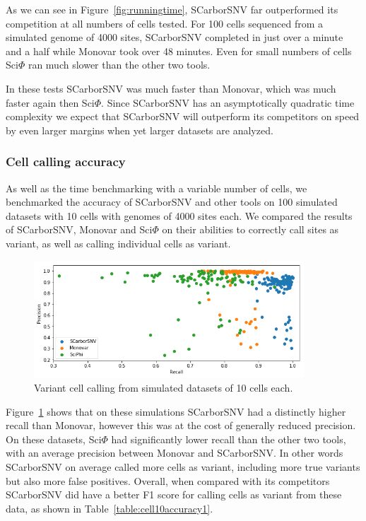 \documentclass[../../main.tex]{subfiles}
\begin{document}
As we can see in Figure~\ref{fig:runningtime}, SCarborSNV far outperformed its competition at all numbers of cells tested.
For 100 cells sequenced from a simulated genome of 4000 sites, SCarborSNV completed in just over a minute and a half while Monovar took over 48 minutes.
Even for small numbers of cells Sci$\Phi$ ran much slower than the other two tools.

In these tests SCarborSNV was much faster than Monovar, which was much faster again then Sci$\Phi$.
Since SCarborSNV has an asymptotically quadratic time complexity we expect that SCarborSNV will outperform its competitors on speed by even larger margins when yet larger datasets are analyzed.

\subsubsection*{Cell calling accuracy}
As well as the time benchmarking with a variable number of cells, we benchmarked the accuracy of SCarborSNV and other tools on 100 simulated datasets with 10 cells with genomes of 4000 sites each.
We compared the results of SCarborSNV, Monovar and Sci$\Phi$ on their abilities to correctly call sites as variant, as well as calling individual cells as variant.
\begin{figure}[h] 
    \includegraphics[width=0.9\textwidth]{sections/graphics/cell10accuracy1}
    \caption{Variant cell calling from simulated datasets of 10 cells each.}
    \label{fig:cell10accuracy1}
\end{figure}
Figure~\ref{fig:cell10accuracy1} shows that on these simulations SCarborSNV had a distinctly higher recall than Monovar, however this was at the cost of generally reduced precision.
On these datasets, Sci$\Phi$ had significantly lower recall than the other two tools, with an average precision between Monovar and SCarborSNV.
In other words SCarborSNV on average called more cells as variant, including more true variants but also more false positives.
Overall, when compared with its competitors SCarborSNV did have a better F1 score for calling cells as variant from these data, as shown in Table~\ref{table:cell10accuracy1}.
\end{document}
